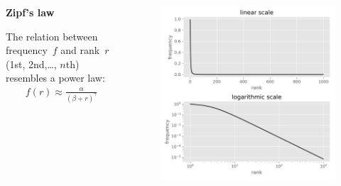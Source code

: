\begin{frame}{\insertsectionhead}
  \begin{columns}
    \begin{column}{.53\linewidth}
      \textbf{Zipf's law}~\citep{Zipf1949}

      The relation between \alert{frequency}~$f$ and \alert{rank}~$r$ (1st, 2nd,\ldots, $n$th) resembles a power law:
      \begin{align*}
        f(r) \approx \frac{\alpha}{(\beta + r)^\gamma}
      \end{align*}
    \end{column}\hfill
    \pause
    \begin{column}{.47\linewidth}
      \begin{figure}
        \centering
        \includegraphics[width=\textwidth]{img/zipf_model.png}
      \end{figure}
    \end{column}
  \end{columns}
\end{frame}

